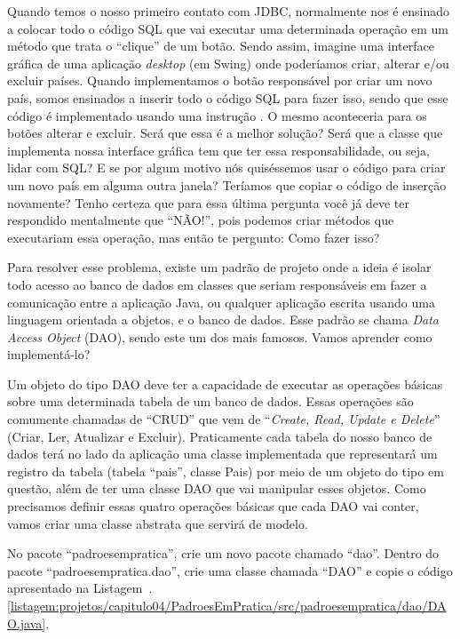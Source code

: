 Quando temos o nosso primeiro contato com JDBC, normalmente nos é ensinado a colocar todo o código SQL que vai executar uma determinada operação em um método que trata o ``clique'' de um botão. Sendo assim, imagine uma interface gráfica de uma aplicação \textit{desktop} (em Swing) onde poderíamos criar, alterar e/ou excluir países. Quando implementamos o botão responsável por criar um novo país, somos ensinados a inserir todo o código SQL para fazer isso, sendo que esse código é implementado usando uma instrução . O mesmo aconteceria para os botões alterar e excluir. Será que essa é a melhor solução? Será que a classe que implementa nossa interface gráfica tem que ter essa responsabilidade, ou seja, lidar com SQL? E se por algum motivo nós quiséssemos usar o código para criar um novo país em alguma outra janela? Teríamos que copiar o código de inserção novamente? Tenho certeza que para essa última pergunta você já deve ter respondido mentalmente que ``NÃO!'', pois podemos criar métodos que executariam essa operação, mas então te pergunto: Como fazer isso?

Para resolver esse problema, existe um padrão de projeto onde a ideia é isolar todo acesso ao banco de dados em classes que seriam responsáveis em fazer a comunicação entre a aplicação Java, ou qualquer aplicação escrita usando uma linguagem orientada a objetos, e o banco de dados. Esse padrão se chama \textit{Data Access Object} (DAO), sendo este um dos mais famosos. Vamos aprender como implementá-lo?

Um objeto do tipo DAO deve ter a capacidade de executar as operações básicas sobre uma determinada tabela de um banco de dados. Essas operações são comumente chamadas de ``CRUD'' que vem de ``\textit{Create, Read, Update e Delete}'' (Criar, Ler, Atualizar e Excluir). Praticamente cada tabela do nosso banco de dados terá no lado da aplicação uma classe implementada que representará um registro da tabela (tabela ``pais'', classe Pais) por meio de um objeto do tipo em questão, além de ter uma classe DAO que vai manipular esses objetos. Como precisamos definir essas quatro operações básicas que cada DAO vai conter, vamos criar uma classe abstrata que servirá de modelo.

No pacote ``padroesempratica'', crie um novo pacote chamado ``dao''. Dentro do pacote ``padroesempratica.dao'', crie uma classe chamada ``DAO'' e copie o código apresentado na Listagem~\thechapter.\ref{listagem:projetos/capitulo04/PadroesEmPratica/src/padroesempratica/dao/DAO.java}.

